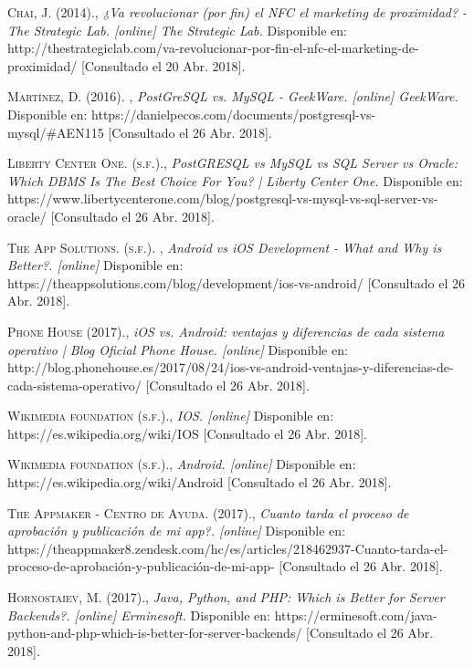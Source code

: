 \textsc{Chai, J. (2014).}, 
\textit{¿Va revolucionar (por fin) el NFC el marketing de proximidad? - The Strategic Lab. [online] The Strategic Lab.}
Disponible en: http://thestrategiclab.com/va-revolucionar-por-fin-el-nfc-el-marketing-de-proximidad/ [Consultado el 20 Abr. 2018].

 \textsc{Martínez, D. (2016). }, 
\textit{PostGreSQL vs. MySQL - GeekWare. [online] GeekWare. }
Disponible en: https://danielpecos.com/documents/postgresql-vs-mysql/\#AEN115 [Consultado el 26 Abr. 2018].

 \textsc{Liberty Center One. (s.f.).}, 
\textit{PostGRESQL vs MySQL vs SQL Server vs Oracle: Which DBMS Is The Best Choice For You? | Liberty Center One.}
Disponible en: https://www.libertycenterone.com/blog/postgresql-vs-mysql-vs-sql-server-vs-oracle/ [Consultado el 26 Abr. 2018].


 \textsc{The App Solutions. (s.f.). }, 
\textit{Android vs iOS Development - What and Why is Better?. [online]}
Disponible en: https://theappsolutions.com/blog/development/ios-vs-android/ [Consultado el 26 Abr. 2018].

 \textsc{Phone House (2017).}, 
\textit{iOS vs. Android: ventajas y diferencias de cada sistema operativo | Blog Oficial Phone House. [online] }
Disponible en: http://blog.phonehouse.es/2017/08/24/ios-vs-android-ventajas-y-diferencias-de-cada-sistema-operativo/ [Consultado el 26 Abr. 2018].

 \textsc{Wikimedia foundation (s.f.).}, 
\textit{IOS. [online]}
Disponible en: https://es.wikipedia.org/wiki/IOS [Consultado el 26 Abr. 2018].

 \textsc{Wikimedia foundation (s.f.).}, 
\textit{Android. [online]}
Disponible en: https://es.wikipedia.org/wiki/Android  [Consultado el 26 Abr. 2018].

 \textsc{The Appmaker - Centro de Ayuda. (2017).}, 
\textit{Cuanto tarda el proceso de aprobación y publicación de mi app?. [online]}
Disponible en: https://theappmaker8.zendesk.com/hc/es/articles/218462937-Cuanto-tarda-el-proceso-de-aprobación-y-publicación-de-mi-app- [Consultado el 26 Abr. 2018].


 \textsc{Hornostaiev, M. (2017).}, 
\textit{Java, Python, and PHP: Which is Better for Server Backends?. [online] Erminesoft.}
Disponible en: https://erminesoft.com/java-python-and-php-which-is-better-for-server-backends/ [Consultado el 26 Abr. 2018].

